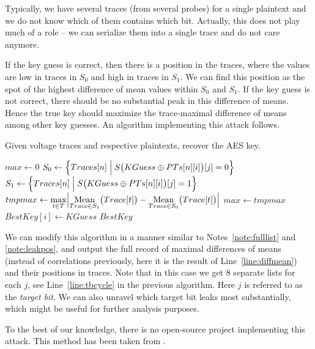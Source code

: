 	\begin{note}
	\label{note:concattraces}
		Typically, we have several traces (from several probes) for a single plaintext and we do not know which of them contains which bit. Actually, this does not play much of a role -- we can serialize them into a single trace and do not care anymore.
	\end{note}
	
	If the key guess is correct, then there is a position in the traces, where the values are low in traces in $S_0$ and high in traces in $S_1$. We can find this position as the spot of the highest difference of mean values within $S_0$ and $S_1$. If the key guess is not correct, there should be no substantial peak in this difference of means. Hence the true key should maximize the trace-maximal difference of means among other key guesses. An algorithm implementing this attack follows.
	
	\begin{alg}
	\label{alg:bitwisedpa}
	Given voltage traces and respective plaintexts, recover the AES key.
		\begin{algorithmic}[1]
					\State $max \gets 0$
						 \label{line:tbcycle}
							\State $S_0 \gets \Bigl\{ Traces[n] \Bigm| S\bigl(KGuess\oplus PTs[n][i]\bigr)[j] = 0 \Bigr\}$ \label{line:s0}
							\State $S_1 \gets \Bigl\{ Traces[n] \Bigm| S\bigl(KGuess\oplus PTs[n][i]\bigr)[j] = 1 \Bigr\}$ \label{line:s1}
							\State $tmpmax \gets \max\limits_{t\in T} \Bigl| \operatorname*{Mean}\limits_{Trace\in S_1}\bigl(Trace[t]\bigr) - \operatorname*{Mean}\limits_{Trace\in S_0}\bigl(Trace[t]\bigr) \Bigr|$
								\label{line:diffmean}
								\State $max \gets tmpmax$
								\State $BestKey[i] \gets KGuess$
							\EndIf
						\EndFor
					\EndFor
				\EndFor
				\State\Return $BestKey$
			\EndFunction
		\end{algorithmic}
	\end{alg}
	
	\begin{note}
	\label{note:eightlists}
		We can modify this algorithm in a manner similar to Notes~\ref{note:fulllist} and \ref{note:leakpos}, and output the full record of maximal differences of means (instead of correlations previously, here it is the result of Line~\ref{line:diffmean}) and their positions in traces. Note that in this case we get $8$ separate lists for each $j$, see Line~\ref{line:tbcycle} in the previous algorithm. Here $j$ is referred to as the {\em target bit}. We can also unravel which target bit leaks most substantially, which might be useful for further analysis purposes.
	\end{note}
	
	To the best of our knowledge, there is no open-source project implementing this attack. This method has been taken from \cite{teuwen2015movfuscator}.
	